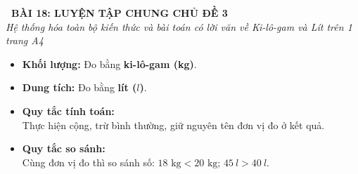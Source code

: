 \documentclass[11pt,a4paper]{article}
\begin{document}
\begin{tcolorbox}[
  enhanced,
  colback=violet!8!white,
  colframe=violet!70!black,
  arc=3mm, boxrule=1.2pt,
  left=3mm, right=3mm, top=2mm, bottom=2mm,
  halign=center
]
  {\LARGE\bfseries\color{violet!90!black}\faBookmark\ BÀI 18: LUYỆN TẬP CHUNG CHỦ ĐỀ 3}\\[1mm]
  {\itshape\footnotesize\color{black!75} Hệ thống hóa toàn bộ kiến thức và bài toán có lời văn về Ki-lô-gam và Lít trên 1 trang A4}
\end{tcolorbox}

\vspace{-2mm}

\noindent
\begin{minipage}[t]{0.49\textwidth}\vspace{0pt}
\begin{tcolorbox}[
  enhanced,
  colback=violet!4!white,
  colframe=violet!75!black,
  arc=2mm, boxrule=0.8pt,
  left=2mm, right=2mm, top=1.8mm, bottom=1.8mm,
  title={\footnotesize\bfseries\color{white}\faKey\ 1. Hai đại lượng thực hành}
]
{\footnotesize
\begin{itemize}\setlength{\itemsep}{1pt}\setlength{\leftskip}{-2.5mm}
  \item \textbf{Khối lượng:} Đo bằng \textbf{ki-lô-gam (kg)}.
  \item \textbf{Dung tích:} Đo bằng \textbf{lít ($l$)}.
  \item \textbf{Quy tắc tính toán:}\\
  Thực hiện cộng, trừ bình thường, giữ nguyên tên đơn vị đo ở kết quả.
  \item \textbf{Quy tắc so sánh:}\\
  Cùng đơn vị đo thì so sánh số: $18\text{ kg} < 20\text{ kg}$; $45\ l > 40\ l$.
\end{itemize}
}
\end{tcolorbox}
\end{minipage}
\hfill
\end{document}
